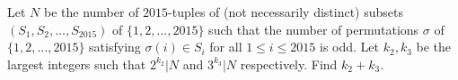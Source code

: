 Let $N$ be the number of $2015$-tuples of (not necessarily distinct) subsets $(S_1, S_2, \dots, S_{2015})$ of $\{1, 2, \dots, 2015 \}$ such that the number of permutations $\sigma$ of $\{1, 2, \dots, 2015 \}$ satisfying $\sigma(i) \in S_i$ for all $1 \le i \le 2015$ is odd. Let $k_2, k_3$ be the largest integers such that $2^{k_2} | N$ and $3^{k_3} | N$ respectively. Find $k_2 + k_3.$
